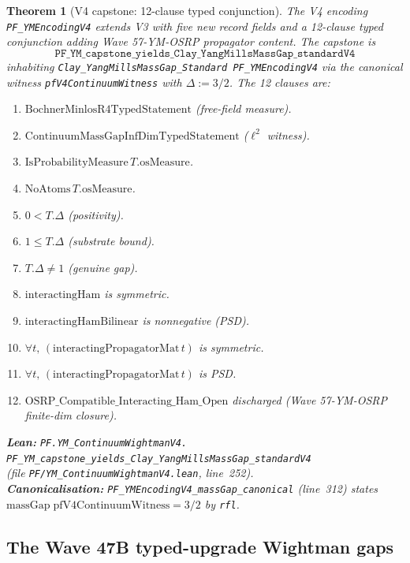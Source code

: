 \documentclass[11pt,a4paper]{article}
\theoremstyle{plain}
\newtheorem{theorem}{Theorem}[section]
\theoremstyle{definition}
\begin{document}
\begin{theorem}[V4 capstone: 12-clause typed conjunction]
\label{thm:v4capstone}
The V4 encoding \texttt{PF\_YMEncodingV4} extends V3 with five new
record fields and a 12-clause typed conjunction adding Wave 57-YM-OSRP
propagator content. The capstone is
\[
\texttt{PF\_YM\_capstone\_yields\_Clay\_YangMillsMassGap\_standardV4}
\]
inhabiting
\texttt{Clay\_YangMillsMassGap\_Standard PF\_YMEncodingV4} via the
canonical witness \texttt{pfV4ContinuumWitness} with $\Delta := 3/2$.
The 12 clauses are:
\begin{enumerate}[label=(\arabic*),leftmargin=*,nosep]
\item $\mathrm{BochnerMinlosR4TypedStatement}$ (free-field measure).
\item $\mathrm{ContinuumMassGapInfDimTypedStatement}$ ($\ell^{2}$
witness).
\item $\mathrm{IsProbabilityMeasure}\,T.\mathrm{osMeasure}$.
\item $\mathrm{NoAtoms}\,T.\mathrm{osMeasure}$.
\item $0 < T.\Delta$ (positivity).
\item $1 \le T.\Delta$ (substrate bound).
\item $T.\Delta \neq 1$ (genuine gap).
\item $\mathrm{interactingHam}$ is symmetric.
\item $\mathrm{interactingHamBilinear}$ is nonnegative (PSD).
\item $\forall t,\,(\mathrm{interactingPropagatorMat}\,t)$ is
symmetric.
\item $\forall t,\,(\mathrm{interactingPropagatorMat}\,t)$ is PSD.
\item $\mathrm{OSRP\_Compatible\_Interacting\_Ham\_Open}$ discharged
(Wave 57-YM-OSRP finite-dim closure).
\end{enumerate}
\textbf{Lean:}
\texttt{PF.YM\_ContinuumWightmanV4.\\
PF\_YM\_capstone\_yields\_Clay\_YangMillsMassGap\_standardV4}\\
(file \texttt{PF/YM\_ContinuumWightmanV4.lean}, line~252).\\
\textbf{Canonicalisation:}
\texttt{PF\_YMEncodingV4\_massGap\_canonical} (line~312)
states $\mathrm{massGap}\;\mathrm{pfV4ContinuumWitness} = 3/2$ by
\texttt{rfl}.
\end{theorem}

\subsection{The Wave 47B typed-upgrade Wightman gaps}
\end{document}
